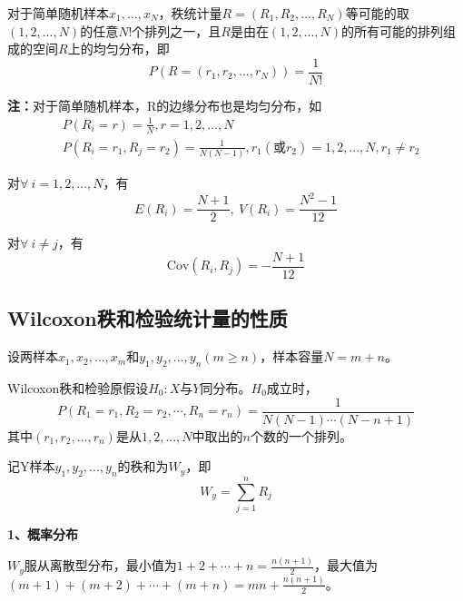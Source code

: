 \documentclass[lang=cn,10pt]{elegantbook}
\begin{document}
\begin{proposition}
    对于简单随机样本$x_1,...,x_{N}$，秩统计量$R = (R_1,R_2,...,R_N)$等可能的取$(1,2,...,N)$的任意$N!$个排列之一，且$R$是由在$(1,2,...,N)$的所有可能的排列组成的空间$R$上的均匀分布，即
    \begin{equation}
        P(R = (r_1,r_2,...,r_N)) = \frac{1}{N!}
    \end{equation}
\end{proposition}
\textbf{注：}对于简单随机样本，R的边缘分布也是均匀分布，如
\begin{equation}
    \begin{aligned}
        & P(R_i = r) = \frac1N, r = 1,2,...,N \\
        & P(R_i=r_1,R_j=r_2) = \frac1{N(N-1)}, r_1(\text{或}r_2) = 1,2,...,N, r_1\neq r_2
    \end{aligned}
\end{equation}

\begin{theorem}
    对$\forall~i = 1,2,...,N$，有
    \begin{equation}
        E(R_i)=\frac{N+1}2,~V(R_i)=\frac{N^2 -1}{12}
    \end{equation}
\end{theorem}

\begin{theorem}
    对$\forall~i \neq j$，有
    \begin{equation}
        \mathrm{Cov}(R_i,R_j) = -\frac{N+1}{12}
    \end{equation}
\end{theorem}

\subsection{Wilcoxon秩和检验统计量的性质}
设两样本$x_1,x_2,...,x_{m}$和$y_1,y_2,...,y_n(m \geq n)$，样本容量$N = m + n$。

Wilcoxon秩和检验原假设$H_0:X$与$Y$同分布。$H_0$成立时，
$$
    P(R_1=r_1,R_2=r_2,\cdots,R_n=r_n)=\frac1{N(N-1)\cdots(N-n+1)}
$$
其中$(r_1,r_2,...,r_n)$是从$1,2,...,N$中取出的$n$个数的一个排列。

记Y样本$y_1,y_2,...,y_n$的秩和为$W_y$，即
\begin{equation}
    W_y = \sum_{j=1}^{n}R_{j}
\end{equation}

\textbf{1、概率分布}

$W_y$服从离散型分布，最小值为$1+2+\cdots+n=\frac{n(n+1)}{2}$，最大值为$(m+1)+(m+2)+\cdots+(m+n)=mn+\frac{n(n+1)}{2}$。
\end{document}
